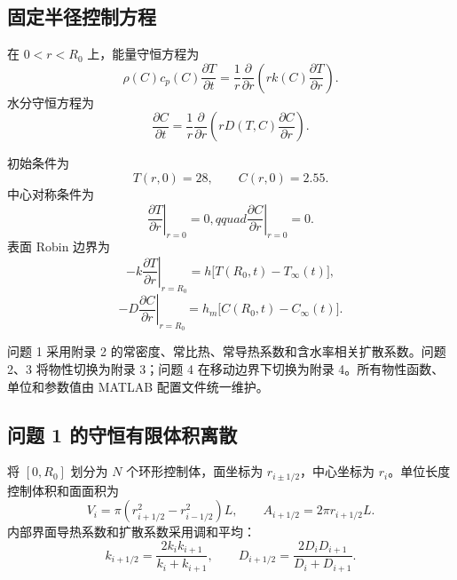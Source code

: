 \documentclass[UTF8,a4paper,11pt]{ctexart}
\begin{document}
\subsection{固定半径控制方程}

在 $0<r<R_0$ 上，能量守恒方程为
\begin{equation}
\rho(C)c_p(C)\frac{\partial T}{\partial t}
=\frac{1}{r}\frac{\partial}{\partial r}
\left(rk(C)\frac{\partial T}{\partial r}\right).
\end{equation}
水分守恒方程为
\begin{equation}
\frac{\partial C}{\partial t}
=\frac{1}{r}\frac{\partial}{\partial r}
\left(rD(T,C)\frac{\partial C}{\partial r}\right).
\end{equation}

初始条件为
\begin{equation}
T(r,0)=28,\qquad C(r,0)=2.55.
\end{equation}
中心对称条件为
\begin{equation}
\left.\frac{\partial T}{\partial r}\right|_{r=0}=0,qquad
\left.\frac{\partial C}{\partial r}\right|_{r=0}=0.
\end{equation}
表面 Robin 边界为
\begin{equation}
-k\left.\frac{\partial T}{\partial r}\right|_{r=R_0}
=h\bigl[T(R_0,t)-T_\infty(t)\bigr],
\end{equation}
\begin{equation}
-D\left.\frac{\partial C}{\partial r}\right|_{r=R_0}
=h_m\bigl[C(R_0,t)-C_\infty(t)\bigr].
\end{equation}

问题 1 采用附录 2 的常密度、常比热、常导热系数和含水率相关扩散系数。问题 2、3 将物性切换为附录 3；问题 4 在移动边界下切换为附录 4。所有物性函数、单位和参数值由 MATLAB 配置文件统一维护。

\subsection{问题 1 的守恒有限体积离散}

将 $[0,R_0]$ 划分为 $N$ 个环形控制体，面坐标为 $r_{i\pm1/2}$，中心坐标为 $r_i$。单位长度控制体积和面面积为
\begin{equation}
V_i=\pi\left(r_{i+1/2}^2-r_{i-1/2}^2\right)L,
\qquad A_{i+1/2}=2\pi r_{i+1/2}L.
\end{equation}
内部界面导热系数和扩散系数采用调和平均：
\begin{equation}
k_{i+1/2}=\frac{2k_ik_{i+1}}{k_i+k_{i+1}},
\qquad
D_{i+1/2}=\frac{2D_iD_{i+1}}{D_i+D_{i+1}}.
\end{equation}
\end{document}
